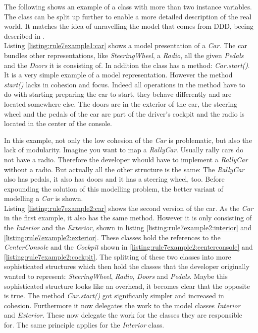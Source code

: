 The following shows an example of a class with more than two instance variables. The class can be split up further to enable a more detailed description of the real world. It matches the idea of unravelling the model that comes from \ac{DDD}, beeing described in \cite{dddbook}.
\\

Listing \ref{listing:rule7example1:car} shows a model presentation of a \textit{Car}. The car bundles other representations, like \textit{SteeringWheel}, a \textit{Radio}, all the given \textit{Pedals} and the \textit{Doors} it is consisting of. In addition the class has a method: \textit{Car.start()}. It is a very simple example of a model representation. However the method \textit{start()} lacks in cohesion and focus. Indeed all operations in the method have to do with starting preparing the car to start, they behave differently and are located somewhere else. The doors are in the exterior of the car, the steering wheel and the pedals of the car are part of the driver's cockpit and the radio is located in the center of the console.

In this example, not only the low cohesion of the \textit{Car} is problematic, but also the lack of modularity. Imagine you want to map a \textit{RallyCar}. Usually rally cars do not have a radio. Therefore the developer whould have to implement a \textit{RallyCar} without a radio. But actually all the other structure is the same: The \textit{RallyCar} also has pedals, it also has doors and it has a steering wheel, too. Before expounding the solution of this modelling problem, the better variant of modelling a \textit{Car} is shown. 
\\

Listing \ref{listing:rule7example2:car} shows the second version of the car. As the \textit{Car} in the first example, it also has the same method. However it is only consisting of the \textit{Interior} and the \textit{Exterior}, shown in listing \ref{listing:rule7example2:interior} and \ref{listing:rule7example2:exterior}. These classes hold the references to the \textit{CenterConsole} and the \textit{Cockpit} shown in \ref{listing:rule7example2:centerconsole} and \ref{listing:rule7example2:cockpit}. The splitting of these two classes into more sophisticated structures which then hold the classes that the developer originally wanted to represent: \textit{SteeringWheel}, \textit{Radio}, \textit{Doors} and \textit{Pedals}. Maybe this sophisticated structure looks like an overhead,  it becomes clear that the opposite is true. The method \textit{Car.start()} got significanly simpler and increased in cohesion. Furthermore it now delegates the work to the model classes \textit{Interior} and \textit{Exterior}. These now delegate the work for the classes they are responsible for. The same principle applies for the \textit{Interior} class. 
\\

